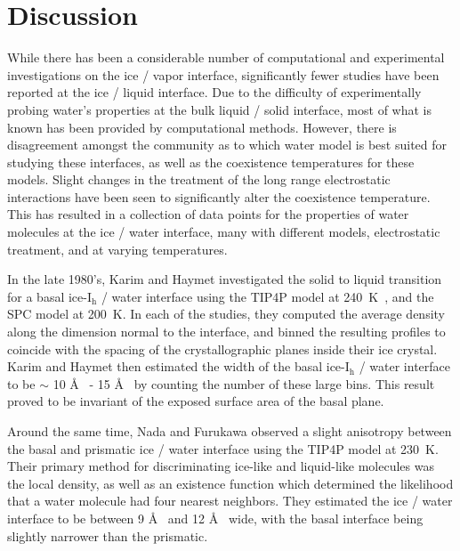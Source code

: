 \section{Discussion}
While there has been a considerable number of computational and
experimental investigations on the ice / vapor
interface\cite{Bolton2000,Conde2008,Gladich2011,Sazaki2012,Pfalzgraff2011,Watkins2011,Bartels-Rausch2014,Gladich2015,Murata2015,Asakawa2016,Benet2016,Murata2016,Neshyba2016,Limmer2016,Michaelides2017,Sanchez2017},
significantly fewer studies have been reported at the ice / liquid
interface. \cite{Beaglehole1980,Karim1988,Karim1990,Hayward2001,Hayward2002,Bryk2002,Gay2002}
Due to the difficulty of experimentally probing water's properties at
the bulk liquid / solid interface, most of what is known has been
provided by computational methods. However, there is disagreement
amongst the community as to which water model is best suited for
studying these
interfaces\cite{Sanz2004a,Vega2005c,Abascal2007,Vega2009}, as well as
the coexistence temperatures for these
models.\cite{Gao2000,Bryk2004,Sanz2004a,Vega2006a,Abascal2007,Paesani2016}
Slight changes in the treatment of the long range electrostatic
interactions have been seen to significantly alter the coexistence
temperature.\cite{Bryk2004} This has resulted in a collection of data
points for the properties of water molecules at the ice / water
interface, many with different models, electrostatic treatment, and at
varying temperatures.

In the late 1980's, Karim and Haymet investigated the solid to liquid
transition for a basal ice-I$_\mathrm{h}$ / water interface using the
TIP4P model at 240~K~\cite{Karim1987,Karim1988}, and the SPC model at
200~K.\cite{Karim1990} In each of the studies, they computed the
average density along the dimension normal to the interface, and
binned the resulting profiles to coincide with the
spacing of the crystallographic planes inside their ice crystal. Karim
and Haymet then estimated the width of the basal ice-I$_\mathrm{h}$ /
water interface to be $\sim$ 10 \AA~ - 15 \AA~ by counting the number of
these large bins. This result proved to be invariant of the exposed
surface area of the basal plane.

Around the same time, Nada and Furukawa observed a slight anisotropy
between the basal and prismatic ice / water interface using the TIP4P
model at 230~K.\cite{Nada1995} Their primary method for discriminating
ice-like and liquid-like molecules was the local density, as well as
an existence function which determined the likelihood that a water
molecule had four nearest neighbors. They estimated the ice / water
interface to be between 9 \AA~ and 12 \AA~ wide, with the basal
interface being slightly narrower than the prismatic.

